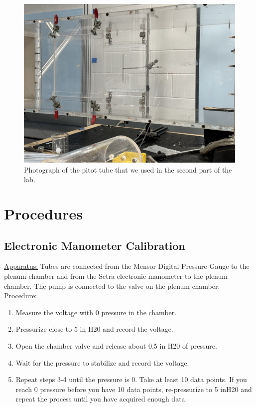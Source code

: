 \begin{figure}[htpb]
    \centering
    \includegraphics[width=0.75\linewidth]{Figures/IMG_3132.jpeg}
    \caption[Photograph of the pitot tube that we used in the second part of the lab.]{Photograph of the pitot tube that we used in the second part of the lab.}
    \label{fig: IMG_3132.jpeg}
\end{figure}



\newpage

\section{Procedures}\label{sec:procedures}

\subsection{Electronic Manometer Calibration}\label{sec:calibration}

\underline{Apparatus:} Tubes are connected from the Mensor Digital Pressure Gauge to the plenum chamber and from the Setra electronic manometer to the plenum chamber. The pump is connected to the valve on the plenum chamber. \\
\underline{Procedure:} 
\begin{enumerate}
    \item Measure the voltage with 0 pressure in the chamber. 
    \item Pressurize close to 5 in H20 and record the voltage. 
    \item Open the chamber valve and release about 0.5 in H20 of pressure.  
    \item Wait for the pressure to stabilize and record the voltage.  
    \item Repeat steps 3-4 until the pressure is 0. Take at least 10 data points. If you reach 0 pressure before you have 10 data points, re-pressurize to 5 inH20 and repeat the process until you have acquired enough data.
\end{enumerate}

